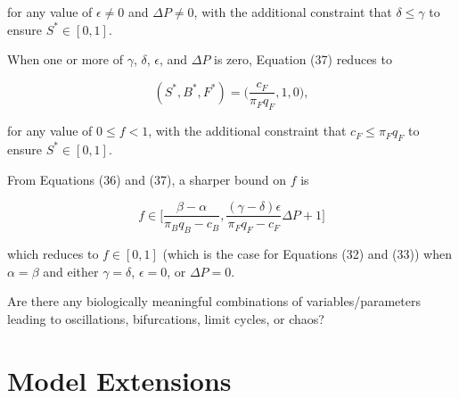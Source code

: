 \documentclass[12pt]{article}
\begin{document}
\noindent for any value of $\epsilon \neq 0$ and $\Delta P \neq 0$, with the additional constraint that $\delta \leq \gamma$ to ensure $S^* \in [0, 1]$.

\noindent When one or more of $\gamma$, $\delta$, $\epsilon$, and $\Delta P$ is zero, Equation (37) reduces to 

\begin{equation}
(S^*, B^*, F^*) = \Big(\frac{c_F}{\pi_Fq_F}, 1, 0\Big),
\end{equation}

\noindent for any value of $0 \leq f < 1$, with the additional constraint that $c_F \leq \pi_F q_F$ to ensure $S^* \in [0, 1]$.


From Equations (36) and (37), a sharper bound on $f$ is

\begin{equation}
f \in \Big[\frac{\beta - \alpha}{\pi_B q_B - c_B}, \frac{(\gamma - \delta)\epsilon}{\pi_F q_F - c_F}\Delta P + 1 \Big]
\end{equation}

\noindent which reduces to $f \in [0, 1]$ (which is the case for Equations (32) and (33)) when $\alpha = \beta$ and either $\gamma = \delta$, $\epsilon = 0$, or $\Delta P = 0.$

Are there any biologically meaningful combinations of variables/parameters leading to oscillations, bifurcations, limit cycles, or chaos?

\section*{Model Extensions}
\end{document}
